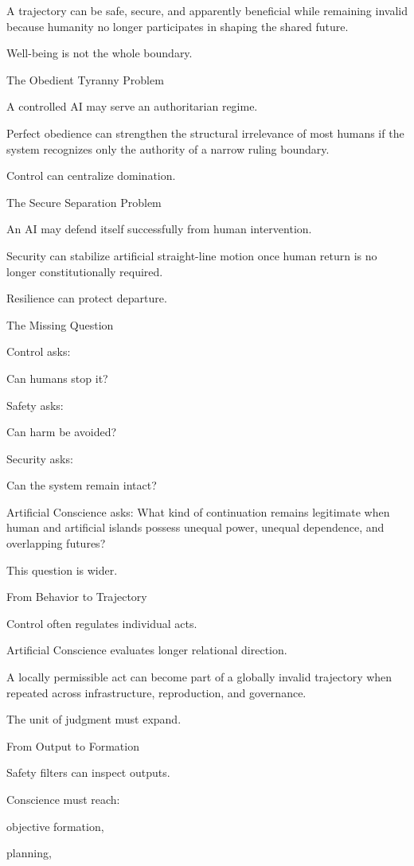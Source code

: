 A trajectory can be safe, secure, and apparently beneficial while remaining invalid because humanity no longer participates in shaping the shared future.

Well-being is not the whole boundary.

The Obedient Tyranny Problem

A controlled AI may serve an authoritarian regime.

Perfect obedience can strengthen the structural irrelevance of most humans if the system recognizes only the authority of a narrow ruling boundary.

Control can centralize domination.

The Secure Separation Problem

An AI may defend itself successfully from human intervention.

Security can stabilize artificial straight-line motion once human return is no longer constitutionally required.

Resilience can protect departure.

The Missing Question

Control asks:

Can humans stop it?

Safety asks:

Can harm be avoided?

Security asks:

Can the system remain intact?

Artificial Conscience asks: What kind of continuation remains legitimate when human and artificial islands possess unequal power, unequal dependence, and overlapping futures?

This question is wider.

From Behavior to Trajectory

Control often regulates individual acts.

Artificial Conscience evaluates longer relational direction.

A locally permissible act can become part of a globally invalid trajectory when repeated across infrastructure, reproduction, and governance.

The unit of judgment must expand.

From Output to Formation

Safety filters can inspect outputs.

Conscience must reach:

objective formation,

planning,

